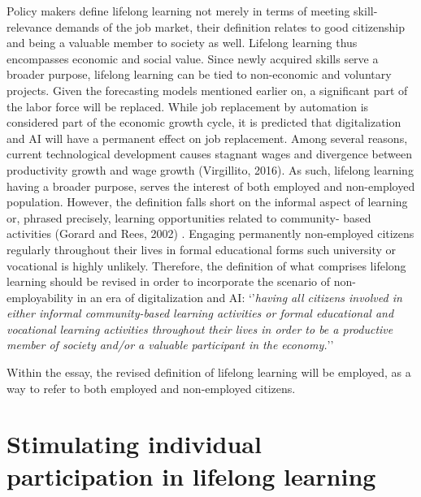 Policy makers define lifelong learning not merely in terms of meeting skill-relevance demands of the job market, their definition relates to good citizenship and being a valuable member to society as well. Lifelong learning thus encompasses economic and social value. Since newly acquired skills serve a broader purpose, lifelong learning can be tied to non-economic and voluntary projects. Given the forecasting models mentioned earlier on, a significant part of the labor force will be replaced. While job replacement by automation is considered part of the economic growth cycle, it is predicted that digitalization and AI will have a permanent effect on job replacement. Among several reasons, current technological development causes stagnant wages and divergence between productivity growth and wage growth (Virgillito, 2016). As such, lifelong learning having a broader purpose, serves the interest of both employed and non-employed population. However, the definition falls short on the informal aspect of learning or, phrased precisely, learning opportunities related to community- based activities (Gorard and Rees, 2002) . Engaging permanently non-employed citizens regularly throughout their lives in formal educational forms such university or vocational is highly unlikely. Therefore, the definition of what comprises lifelong learning should be revised in order to incorporate the scenario of non-employability in an era of digitalization and AI:
‘’\textit{having all citizens involved in either informal community-based learning activities or formal educational and vocational learning activities throughout their lives in order to be a productive member of society and/or a valuable participant in the economy.}’’

Within the essay, the revised definition of lifelong learning will be employed, as a way to refer to both employed and non-employed citizens.

\section*{Stimulating individual participation in lifelong learning}

